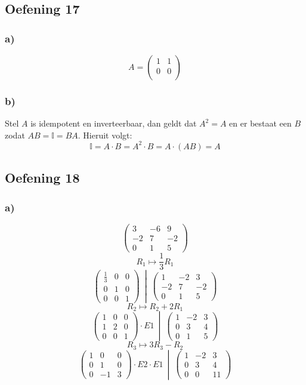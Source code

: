 \documentclass[lineaire_algebra_oplossingen.tex]{subfiles}
\begin{document}
\subsection{Oefening 17}
\subsubsection*{a)}
\[
A= \left(\begin{array} {cc}
    1 & 1\\
    0 & 0\\
\end{array} \right)
\]

\subsubsection*{b)}
Stel $A$ is idempotent en inverteerbaar, dan geldt dat $A^2 = A$ en er bestaat een $B$ zodat $AB = \mathbb{I} = BA$. Hieruit volgt:
\[
\mathbb{I} = A \cdot B = A^2 \cdot B = A \cdot (AB) = A
\]
\subsection{Oefening 18}
\subsubsection*{a)}
\[
\begin{pmatrix}
3 & -6 & 9\\
-2 & 7 & -2\\
0 & 1 & 5
\end{pmatrix}
\]
\[ R_1 \longmapsto \frac{1}{3} R_1 \]
\[
\left.\begin{pmatrix}
\frac{1}{3} & 0 & 0\\
0 & 1 & 0\\
0 & 0 & 1
\end{pmatrix}
\ \middle|\ 
\begin{pmatrix}
1 & -2 & 3\\
-2 & 7 & -2\\
0 & 1 & 5
\end{pmatrix}\right.
\]
\[ R_2 \longmapsto R_2 + 2R_1 \]
\[
\left.\begin{pmatrix}
1 & 0 & 0\\
1 & 2 & 0\\
0 & 0 & 1
\end{pmatrix}
\cdot E1
\ \middle|\ 
\begin{pmatrix}
1 & -2 & 3\\
0 & 3 & 4\\
0 & 1 & 5
\end{pmatrix}\right.
\]
\[ R_3 \longmapsto 3R_3 - R_2 \]
\[
\left.\begin{pmatrix}
1 & 0 & 0\\
0 & 1 & 0\\
0 & -1 & 3
\end{pmatrix}
\cdot E2 \cdot E1
\ \middle|\ 
\begin{pmatrix}
1 & -2 & 3\\
0 & 3 & 4\\
0 & 0 & 11
\end{pmatrix}\right.
\]
\end{document}
